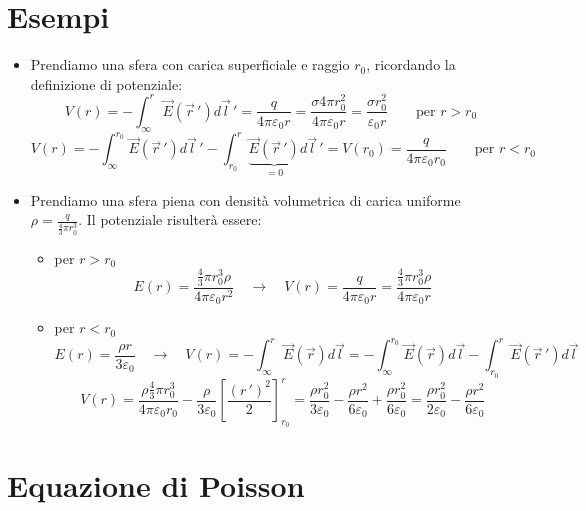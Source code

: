 \documentclass{book}
\begin{document}
\section{Esempi}
\begin{itemize}
    \item Prendiamo una sfera con carica superficiale e raggio $r_0$, ricordando la definizione di potenziale:
    $$
    V(r)= -\int_{\infty}^r \vec{E}(\vec{r}\,') d\vec{l}\,'  =\frac{q}{4 \pi \varepsilon_0 r}  = \frac{\sigma 4 \pi r_0^2}{4 \pi \varepsilon_0 r} = \frac{\sigma r_0^2}{\varepsilon_0 r} \qquad \text{per } r>r_0
    $$
    $$
    V(r)= -\int_{\infty}^{r_0} \vec{E}(\vec{r}\,') d\vec{l}\,' -\int_{r_0}^r \underbrace{\vec{E}(\vec{r}\,')}_{=0} d\vec{l}\,' = V(r_0)  =\frac{q}{4 \pi \varepsilon_0 r_0}   \qquad \text{per } r<r_0
    $$

    
    \item Prendiamo una sfera piena con densità volumetrica di carica  uniforme $\rho = \frac{q}{\frac{4}{3}\pi r_0^3}$.
    Il potenziale risulterà essere:
    \begin{itemize}
        \item per $r>r_0$ 
        $$
        E(r)= \frac{\frac{4}{3}\pi r_0^3 \rho }{4 \pi \varepsilon_0 r^2} \quad \to \quad V(r) = \frac{q}{4 \pi \varepsilon_0 r} = \frac{\frac{4}{3}\pi r_0^3 \rho }{4 \pi \varepsilon_0 r}   $$
    \item per $r<r_0$
    $$ E(r)= \frac{ \rho r }{3 \varepsilon_0 } \quad \to \quad V(r) = - \int_{\infty}^r \vec{E}(\vec{r})d \vec{l} =  - \int_{\infty}^{r_0} \vec{E}(\vec{r})d \vec{l} - \int_{r_0}^r \vec{E}(\vec{r}\,')d \vec{l} $$
    $$  V(r) = \frac{\rho \frac{4}{3} \pi r_0^3}{4 \pi \varepsilon_0 r_0} - \frac{\rho}{3\varepsilon_0} \left[ \frac{(r\,')^2}{2} \right]^r_{r_0} = \frac{\rho r_0^2}{3 \varepsilon_0} - \frac{\rho r^2}{6 \varepsilon_0} + \frac{\rho r_0^2}{6 \varepsilon_0} = \frac{\rho r_0^2}{2 \varepsilon_0} - \frac{\rho r^2}{6 \varepsilon_0} $$
    \end{itemize}
    


\end{itemize}



\section{Equazione di Poisson}
\end{document}
